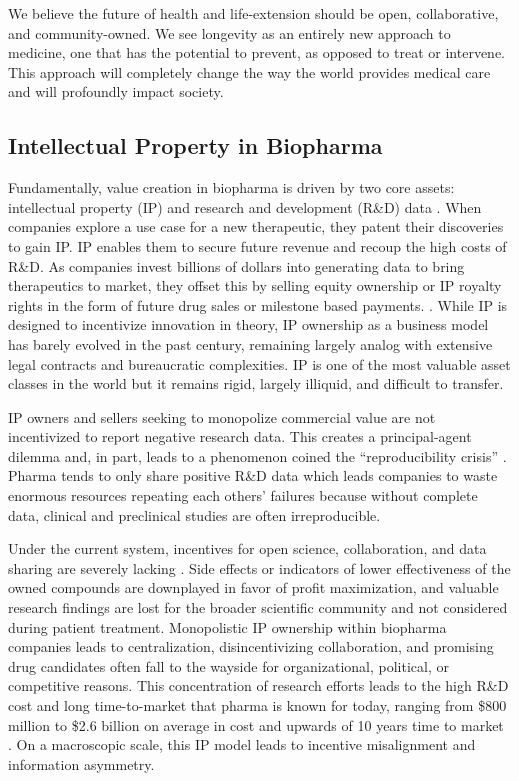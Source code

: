 \documentclass[12pt,letterpaper]{article}
\begin{document}
We believe the future of health and life-extension should be open, collaborative, and community-owned. We see longevity as an entirely new approach to medicine, one that has the potential to prevent, as opposed to treat or intervene. This approach will completely change the way the world provides medical care and will profoundly impact society.

\subsection{Intellectual Property in Biopharma}
Fundamentally, value creation in biopharma is driven by two core assets: intellectual property (IP) and research and development (R\&D) data \citep{Chandra2011}. When companies explore a use case for a new therapeutic, they patent their discoveries to gain IP. IP enables them to secure future revenue and recoup the high costs of R\&D. As companies invest billions of dollars into generating data to bring therapeutics to market, they offset this by selling equity ownership or IP royalty rights in the form of future drug sales or milestone based payments. \citep{Wouters2020}. While IP is designed to incentivize innovation in theory, IP ownership as a business model has barely evolved in the past century, remaining largely analog with extensive legal contracts and bureaucratic complexities. IP is one of the most valuable asset classes in the world but it remains rigid, largely illiquid, and difficult to transfer.

IP owners and sellers seeking to monopolize commercial value are not incentivized to report negative research data. This creates a principal-agent dilemma and, in part, leads to a phenomenon coined the “reproducibility crisis” \citep{Sherkow2017}. Pharma tends to only share positive R\&D data which leads companies to waste enormous resources repeating each others’ failures because without complete data, clinical and preclinical studies are often irreproducible. 

Under the current system, incentives for open science, collaboration, and data sharing are severely lacking \citep{Ali-Khan2017}. Side effects or indicators of lower effectiveness of the owned compounds are downplayed in favor of profit maximization, and valuable research findings are lost for the broader scientific community and not considered during patient treatment. Monopolistic IP ownership within biopharma companies leads to centralization, disincentivizing collaboration, and promising drug candidates often fall to the wayside for organizational, political, or competitive reasons. This concentration of research efforts leads to the high R\&D cost and long time-to-market that pharma is known for today, ranging from \$800 million to \$2.6 billion on average in cost and upwards of 10 years time to market \citep{DiMasi2016}. On a macroscopic scale, this IP model leads to incentive misalignment and information asymmetry. 
\end{document}
